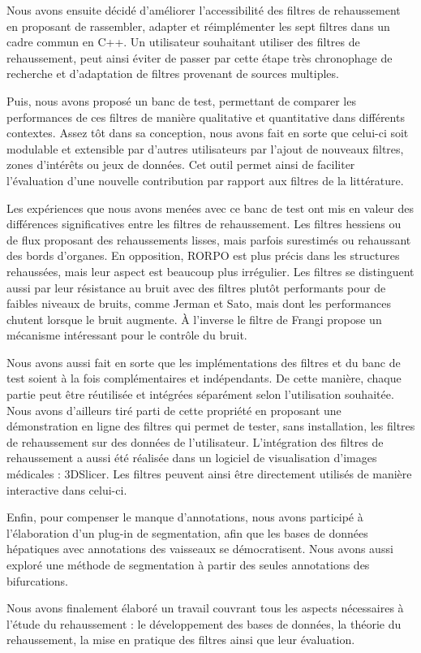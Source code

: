 Nous avons ensuite décidé d'améliorer l'accessibilité des filtres de rehaussement en proposant de rassembler, adapter et réimplémenter les sept filtres dans un cadre commun en C++. Un utilisateur souhaitant utiliser des filtres de rehaussement, peut ainsi éviter de passer par cette étape très chronophage de recherche et d'adaptation de filtres provenant de sources multiples. 

Puis, nous avons proposé un banc de test, permettant de comparer les performances de ces filtres de manière qualitative et quantitative dans différents contextes. Assez tôt dans sa conception, nous avons fait en sorte que celui-ci soit modulable et extensible par d'autres utilisateurs par l'ajout de nouveaux filtres, zones d'intérêts ou jeux de données. Cet outil permet ainsi de faciliter l'évaluation d'une nouvelle contribution par rapport aux filtres de la littérature.

Les expériences que nous avons menées avec ce banc de test ont mis en valeur des différences significatives entre les filtres de rehaussement. Les filtres hessiens ou de flux proposant des rehaussements lisses, mais parfois surestimés ou rehaussant des bords d'organes. En opposition, RORPO est plus précis dans les structures rehaussées, mais leur aspect est beaucoup plus irrégulier. Les filtres se distinguent aussi par leur résistance au bruit avec des filtres plutôt performants pour de faibles niveaux de bruits, comme Jerman et Sato, mais dont les performances chutent lorsque le bruit augmente. À l'inverse le filtre de Frangi propose un mécanisme intéressant pour le contrôle du bruit.

Nous avons aussi fait en sorte que les implémentations des filtres et du banc de test soient à la fois complémentaires et indépendants. De cette manière, chaque partie peut être réutilisée et intégrées séparément selon l'utilisation souhaitée. Nous avons d'ailleurs tiré parti de cette propriété en proposant une démonstration en ligne des filtres qui permet de tester, sans installation, les filtres de rehaussement sur des données de l'utilisateur. L'intégration des filtres de rehaussement a aussi été réalisée dans un logiciel de visualisation d'images médicales : 3DSlicer. Les filtres peuvent ainsi être directement utilisés de manière interactive dans celui-ci.

Enfin, pour compenser le manque d'annotations, nous avons participé à l'élaboration d'un plug-in de segmentation, afin que les bases de données hépatiques avec annotations des vaisseaux se démocratisent. Nous avons aussi exploré une méthode de segmentation à partir des seules annotations des bifurcations.

Nous avons finalement élaboré un travail couvrant tous les aspects nécessaires à l'étude du rehaussement : le développement des bases de données, la théorie du rehaussement, la mise en pratique des filtres ainsi que leur évaluation.